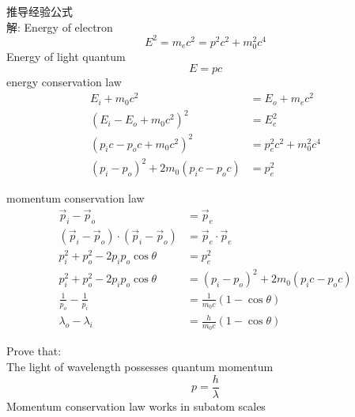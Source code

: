 \begin{frame}  
    推导经验公式\\
    \alert{解:} Energy of electron 
    \begin{equation*}
        E^2 =m_ec^2=p^2c^2 +m_0 ^2 c^4 
    \end{equation*}
    Energy of light quantum
    \begin{equation*}
        E =pc 
    \end{equation*}
    energy conservation law
    \begin{equation*}
        \begin{split}
        E_i + m_0 c^2 &= E_o + m_ec^2 \\
        (E_i -E_o + m_0 c^2)^2 &= E_e ^2\\
        (p_i c-p_o c + m_0 c^2) ^2 &= p_e ^2 c^2 +m_0 ^2 c^4 \\
        (p_i-p_o)^2 +2 m_0 (p_i c-p_o c) &= p_e ^2
    \end{split}
    \end{equation*}
\end{frame}

\begin{frame}  
    momentum conservation law
    \begin{equation*}
        \begin{split}
            \vec{p}_i -\vec{p}_o &= \vec{p}_e \\
            (\vec{p}_i -\vec{p}_o)\cdot (\vec{p}_i -\vec{p}_o)  &= \vec{p}_e\cdot \vec{p}_e   \\
            p_i ^2 + p_o ^2 -2p_i p_o \cos \theta &= p_e ^2  \\
            p_i ^2 + p_o ^2 -2p_i p_o \cos \theta &= (p_i-p_o)^2 +2 m_0 (p_i c-p_o c) \\
            \frac{1}{p_o} -\frac{1}{p_i} &= \frac{1}{m_0 c} (1-\cos \theta) \\
            \lambda_o -\lambda_i &= \frac{h}{m_0 c} (1-\cos \theta) 
        \end{split}
    \end{equation*}
\end{frame}

\begin{frame}   
    \begin{tcolorbox3}[Significance]
        Prove that:\\
        \bullet The light of wavelength \lambda possesses quantum momentum \[p=\frac{h}{\lambda}\]
        \bullet Momentum conservation law works in subatom scales 
    \end{tcolorbox3}   
    \color{deepred}{Nobel Prize in physics（1927）}\\
\end{frame}

